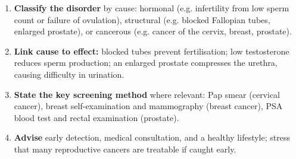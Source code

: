 \documentclass[11pt]{article}
\begin{document}
\begin{methode}
\begin{enumerate}
\item \textbf{Classify the disorder} by cause: hormonal (e.g. infertility from low sperm count or failure of ovulation), structural (e.g. blocked Fallopian tubes, enlarged prostate), or cancerous (e.g. cancer of the cervix, breast, prostate).
\item \textbf{Link cause to effect:} blocked tubes prevent fertilisation; low testosterone reduces sperm production; an enlarged prostate compresses the urethra, causing difficulty in urination.
\item \textbf{State the key screening method} where relevant: Pap smear (cervical cancer), breast self-examination and mammography (breast cancer), PSA blood test and rectal examination (prostate).
\item \textbf{Advise} early detection, medical consultation, and a healthy lifestyle; stress that many reproductive cancers are treatable if caught early.
\end{enumerate}
\end{methode}
\end{document}
